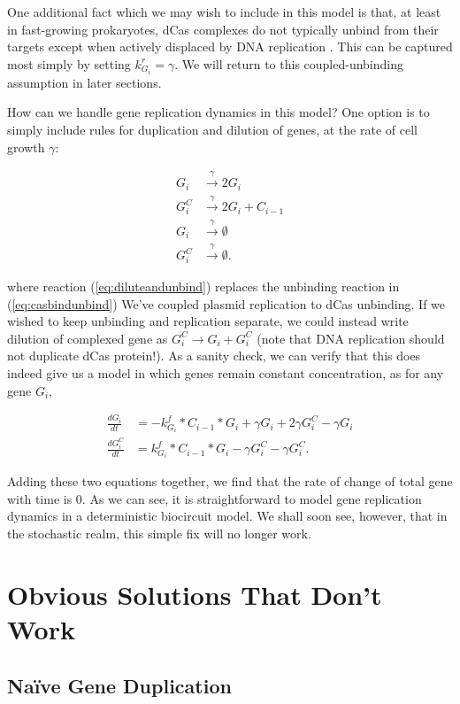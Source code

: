 \documentclass[preprint,12pt]{elsarticle}
\begin{document}
One additional fact which we may wish to include in this model is that, at least in fast-growing prokaryotes, dCas complexes do not typically unbind from their targets except when actively displaced by DNA replication \cite{Jones2017}. This can be captured most simply by setting $k_{G_i}^r = \gamma$. We will return to this coupled-unbinding assumption in later sections. 

How can we handle gene replication dynamics in this model? One option is to simply include rules for duplication and dilution of genes, at the rate of cell growth $\gamma$:

\begin{align}
	G_i &\xrightarrow{\gamma} 2G_i\\
	\label{eq:diluteandunbind} G_i^C &\xrightarrow{\gamma} 2G_i + C_{i-1}\\
	G_i &\xrightarrow{\gamma} \emptyset \\
	G_i^C &\xrightarrow{\gamma} \emptyset.
\end{align}

where reaction (\ref{eq:diluteandunbind}) replaces the unbinding reaction in (\ref{eq:casbindunbind}) We've coupled plasmid replication to dCas unbinding. If we wished to keep unbinding and replication separate, we could instead write dilution of complexed gene as $G_i^C \rightarrow G_i + G_i^C$ (note that DNA replication should not duplicate dCas protein!). As a sanity check, we can verify that this does indeed give us a model in which genes remain constant concentration, as for any gene $G_i$,

\begin{align}
	\frac{dG_i}{dt} &= -k^f_{G_i}*C_{i-1}*G_i + \gamma G_i + 2\gamma G_i^C - \gamma G_i\\
	\frac{dG_i^C}{dt} &= k^f_{G_i}*C_{i-1}*G_i - \gamma G_i^C - \gamma G_i^C.
\end{align}

Adding these two equations together, we find that the rate of change of total gene with time is 0. As we can see, it is straightforward to model gene replication dynamics in a deterministic biocircuit model. We shall soon see, however, that in the stochastic realm, this simple fix will no longer work. 

\section{Obvious Solutions That Don't Work}\label{S:failures}

\subsection{Na\"ive Gene Duplication}
\end{document}
